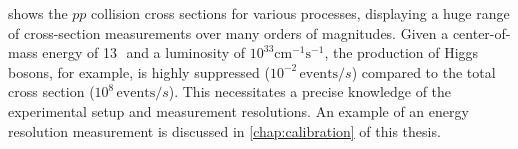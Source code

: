 
 shows the $pp$ collision cross sections for various processes, displaying a huge range of cross-section measurements over many orders of magnitudes. 
Given a center-of-mass energy of 13\,\TeV\ and a luminosity of $10^{33}\mathrm{cm^{-1}s^{-1}}$, the production of Higgs bosons, for example, is highly suppressed ($10^{-2}\,\text{events}/s$) compared to the total cross section ($10^8\,\text{events}/s$).
This necessitates a precise knowledge of the experimental setup and measurement resolutions. An example of an energy resolution measurement is discussed in \cref{chap:calibration} of this thesis. 





